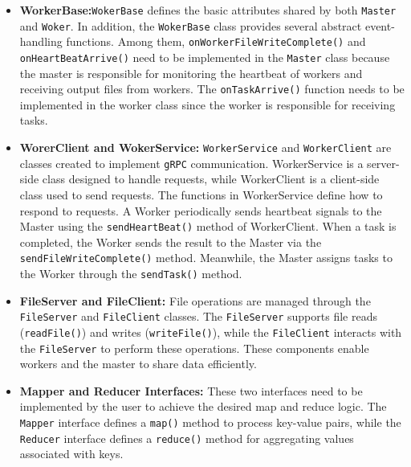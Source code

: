 \begin{itemize}
    \item \textbf{WorkerBase:}\texttt{WokerBase} defines the basic attributes shared by both \texttt{Master} and \texttt{Woker}. In addition, the \texttt{WokerBase} class provides several abstract event-handling functions. Among them, \texttt{onWorkerFileWriteComplete()} and \texttt{onHeartBeatArrive()} need to be implemented in the \texttt{Master} class because the master is responsible for monitoring the heartbeat of workers and receiving output files from workers. The \texttt{onTaskArrive()} function needs to be implemented in the worker class since the worker is responsible for receiving tasks.
    \item \textbf{WorerClient and WokerService:} \texttt{WorkerService} and \texttt{WorkerClient} are classes created to implement \texttt{gRPC} communication. WorkerService is a server-side class designed to handle requests, while WorkerClient is a client-side class used to send requests. The functions in WorkerService define how to respond to requests. A Worker periodically sends heartbeat signals to the Master using the \texttt{sendHeartBeat()} method of WorkerClient. When a task is completed, the Worker sends the result to the Master via the \texttt{sendFileWriteComplete()} method. Meanwhile, the Master assigns tasks to the Worker through the \texttt{sendTask()} method.
    \item \textbf{FileServer and FileClient:} File operations are managed through the \texttt{FileServer} and \texttt{FileClient} classes. The \texttt{FileServer} supports file reads (\texttt{readFile()}) and writes (\texttt{writeFile()}), while the \texttt{FileClient} interacts with the \texttt{FileServer} to perform these operations. These components enable workers and the master to share data efficiently.
    \item \textbf{Mapper and Reducer Interfaces:} These two interfaces need to be implemented by the user to achieve the desired map and reduce logic. The \texttt{Mapper} interface defines a \texttt{map()} method to process key-value pairs, while the \texttt{Reducer} interface defines a \texttt{reduce()} method for aggregating values associated with keys.
\end{itemize}
